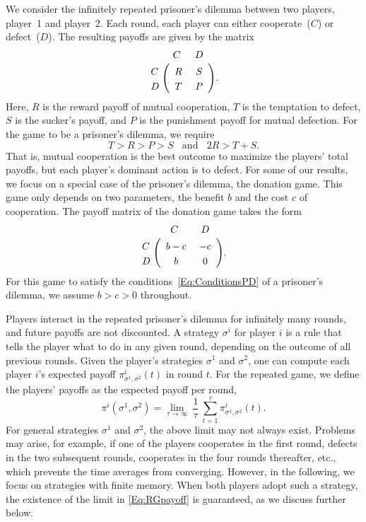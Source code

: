 \documentclass[9pt,twoside,lineno]{pnas-new}
\theoremstyle{plainCl1}
\theoremstyle{plainCl2}
\begin{document}

We consider the infinitely repeated prisoner's dilemma between two players, player~1 and player~2.
Each round, each player can either cooperate~($C$) or defect~($D$). 
The resulting payoffs are given by the matrix 
\begin{align}\label{Eq:PrisonerDilemma}
  \bordermatrix{%
    & C & D \cr
    C &\ R &\ S\  \cr
    D &\ T &\ P\ \cr
  }.
\end{align}
Here, $R$ is the reward payoff of mutual cooperation, $T$ is the temptation to defect, $S$ is the sucker's payoff, and $P$ is the punishment payoff for mutual defection. For the game to be a prisoner's dilemma, we require
\begin{equation} \label{Eq:ConditionsPD}
 T > R > P > S ~~~~\text{and}~~~~ 2 R > T \!+\! S. 
\end{equation}
That is, mutual cooperation is the best outcome to maximize the players' total payoffs, but each player's dominant action is to defect. 
For some of our results, we focus on a special case of the prisoner's dilemma, the donation game. 
This game only depends on two parameters, the benefit $b$ and the cost $c$ of cooperation. 
The payoff matrix of the donation game takes the form
\begin{align} \label{Eq:DonationGame}
  \bordermatrix{%
    & C & D \cr
    C &\ b - c &\ -c\  \cr
    D &\ b &\ 0\ \cr
  }.
\end{align}
For this game to satisfy the conditions~\eqref{Eq:ConditionsPD} of a prisoner's dilemma, we assume $b\!>\!c\!>\!0$ throughout. 

Players interact in the repeated prisoner's dilemma for infinitely many rounds, and future payoffs are not discounted. 
A strategy $\sigma^i$ for player $i$ is a rule that tells the player what to do in any given round, depending on the outcome of all previous rounds. 
Given the player's strategies $\sigma^1$ and $\sigma^2$, one can compute each player $i$'s expected payoff $\pi^i_{\sigma^1,\sigma^2}(t)$ in round $t$. 
For the repeated game, we define the players' payoffs as the expected payoff per round, 
\begin{equation} \label{Eq:RGpayoff}
\pi^i(\sigma^1,\sigma^2) = \lim_{\tau \to \infty}~ \frac{1}{\tau} ~\sum_{t=1}^{\tau} \pi_{\sigma^1,\sigma^2}^i(t).
\end{equation}
For general strategies $\sigma^1$ and $\sigma^2$, the above limit may not always exist. 
Problems may arise, for example, if one of the players cooperates in the first round, defects in the two subsequent rounds, cooperates in the four rounds thereafter, etc., which prevents the time averages from converging. 
However, in the following, we focus on strategies with finite memory. 
When both players adopt such a strategy, the existence of the limit in \eqref{Eq:RGpayoff} is guaranteed, as we discuss further below.
\end{document}
